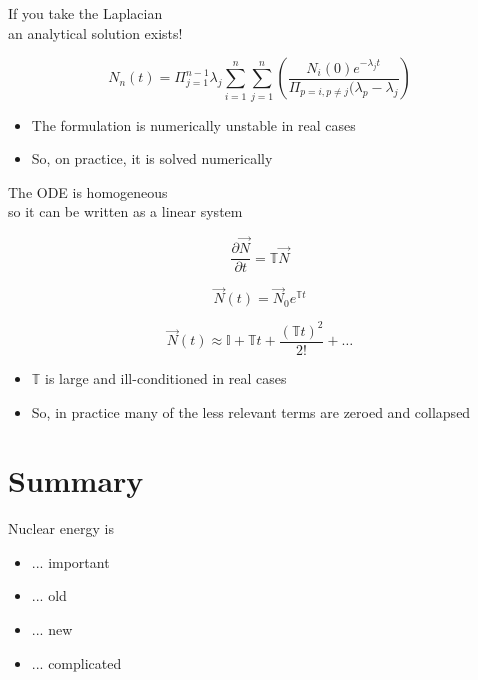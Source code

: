 \documentclass{beamer}
\begin{document}
        \begin{frame}{If you take the Laplacian \\ an analytical solution exists!}

            \begin{equation*}
                N_n(t) = \Pi_{j=1}^{n-1} \lambda_j \sum_{i=1}^n \sum_{j=1}^n \left(\frac{N_i(0) e^{-\lambda_j t}}{\Pi_{p=i,p\ne j}(\lambda_p - \lambda_j}\right)
            \end{equation*}

            \begin{itemize}
                \pause
                \item The formulation is numerically unstable in real cases
                \pause
                \item So, on practice, it is solved numerically
            \end{itemize}
        \end{frame}

        \begin{frame}{The ODE is homogeneous \\ so it can be written as a linear system}

            \begin{equation*}
                \frac{\partial\vec N}{\partial t} = \mathbb{T} \vec N
            \end{equation*}

            \pause
            \begin{equation*}
                \vec N(t) = \vec N_0 e^{\mathbb{T} t}
            \end{equation*}

            \pause
            \begin{equation*}
                \vec N(t) \approx \mathbb{I} + \mathbb{T}t + \frac{\left(\mathbb{T}t\right)^2}{2!} + \dots
            \end{equation*}

            \begin{itemize}
                \pause
                \item $\mathbb{T}$ is large and ill-conditioned in real cases
                \pause
                \item So, in practice many of the less relevant terms are zeroed and collapsed
            \end{itemize}
        \end{frame}

\section*{Summary}

    \begin{frame}{Nuclear energy is}
        \begin{itemize}
            \item ... important
            \pause
            \item ... old
            \pause
            \item ... new
            \pause
            \item ... complicated
        \end{itemize}
    \end{frame}
\end{document}

